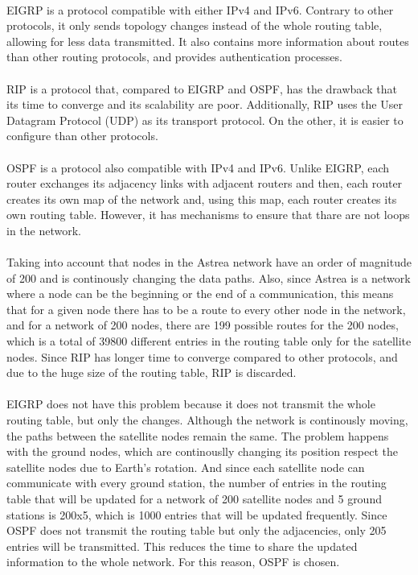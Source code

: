 \paragraph{}EIGRP is a protocol compatible with either IPv4 and IPv6. Contrary to other protocols, it only sends topology changes instead of the whole routing table, allowing for less data transmitted. It also contains more information about routes than other routing protocols, and provides authentication processes.
\paragraph{}RIP is a protocol that, compared to EIGRP and OSPF, has the drawback that its time to converge and its scalability are poor. Additionally, RIP uses the User Datagram Protocol (UDP) as its transport protocol. On the other, it is easier to configure than other protocols.
\paragraph{}OSPF is a protocol also compatible with IPv4 and IPv6. Unlike EIGRP, each router exchanges its adjacency links with adjacent routers and then, each router creates its own map of the network and, using this map, each router creates its own routing table. However, it has mechanisms to ensure that thare are not loops in the network.
\paragraph{}Taking into account that nodes in the Astrea network have an order of magnitude of 200 and is continously changing the data paths. Also, since Astrea is a network where a node can be the beginning or the end of a communication, this means that for a given node there has to be a route to every other node in the network, and for a network of 200 nodes, there are 199 possible routes for the 200 nodes, which is a total of 39800 different entries in the routing table only for the satellite nodes. Since RIP has longer time to converge compared to other protocols, and due to the huge size of the routing table, RIP is discarded.
\paragraph{}EIGRP does not have this problem because it does not transmit the whole routing table, but only the changes. Although the network is continously moving, the paths between the satellite nodes remain the same. The problem happens with the ground nodes, which are continouslly changing its position respect the satellite nodes due to Earth's rotation. And since each satellite node can communicate with every ground station, the number of entries in the routing table that will be updated for a network of 200 satellite nodes and 5 ground stations is 200x5, which is 1000 entries that will be updated frequently. Since OSPF does not transmit the routing table but only the adjacencies, only 205 entries will be transmitted. This reduces the time to share the updated information to the whole network. For this reason, OSPF is chosen.

